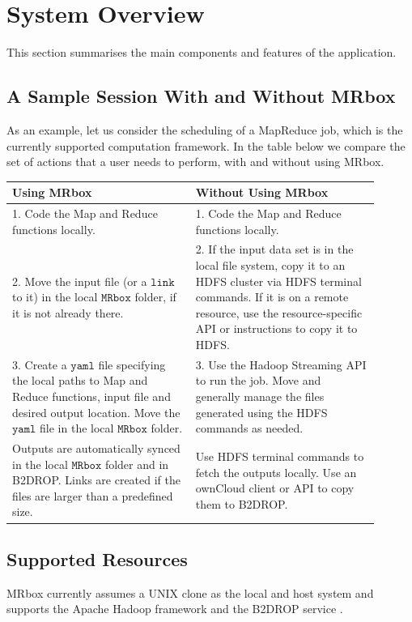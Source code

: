 \section{System Overview}
This section summarises the main components and features of the application.

\subsection{A Sample Session With and Without MRbox}
As an example, let us consider the scheduling of a MapReduce job, which is the currently supported computation framework. In the table below we compare the set of actions that a user needs to perform, with and without using MRbox.

\vspace{.5em}\noindent
\begin{tabular}{p{0.45\linewidth}|p{0.45\linewidth}}
    \textbf{Using MRbox} & \textbf{Without Using MRbox} \\
    \hline
        1. Code the Map and Reduce functions locally. & 1. Code the Map and Reduce functions locally.\\ 
        2. Move the input file (or a $\texttt{link}$ to it) in the local $\texttt{MRbox}$ folder, if it is not already there. & 2. If the input data set is in the local file system, copy it to an HDFS cluster via HDFS terminal commands. If it is on a remote resource, use the resource-specific API or instructions to copy it to HDFS. \\ 
        3. Create a $\texttt{yaml}$ file specifying the local paths to Map and Reduce functions, input file and desired output location. Move the $\texttt{yaml}$ file in the local $\texttt{MRbox}$ folder. & 3. Use the Hadoop Streaming API to run the job. Move and generally manage the files generated using the HDFS commands as needed. \\
    \hline
        Outputs are automatically synced in the local $\texttt{MRbox}$ folder and in B2DROP. Links are created if the files are larger than a predefined size. & Use HDFS terminal commands to fetch the outputs locally. Use an ownCloud client or API to copy them to B2DROP. \\
\end{tabular}

\subsection{Supported Resources}
MRbox currently assumes a UNIX clone as the local and host system and supports the Apache Hadoop framework \cite{hadoop} and the B2DROP service \cite{b2drop}.


